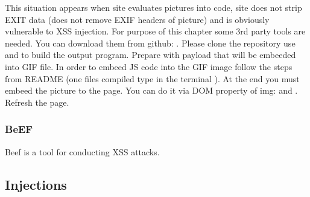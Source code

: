 This situation appears when site evaluates pictures into code, site does not strip EXIT data (does not remove EXIF headers of picture) and is obviously vulnerable to XSS injection.
For purpose of this chapter some 3rd party tools are needed.
You can download them from github: .
Please clone the repository use  and  to build the output program.
Prepare  with payload that will be embeeded into GIF file.
In order to embeed JS code into the GIF image follow the steps from README (one files compiled type in the terminal ).
At the end you must embeed the picture to the page.
You can do it via DOM property of img:  and .
Refresh the page.

\subsubsection{BeEF} Beef is a tool for conducting XSS attacks.





\subsection{Injections}
